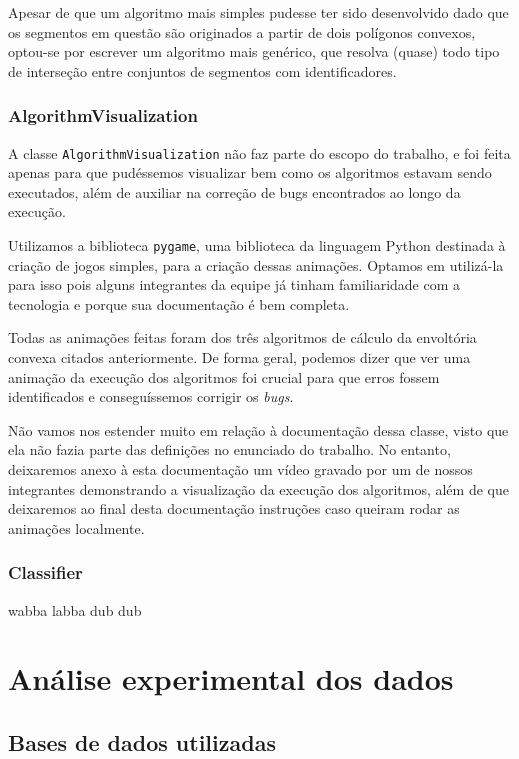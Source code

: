 \documentclass{article}
\begin{document}
Apesar de que um algoritmo mais simples pudesse ter sido desenvolvido dado que os segmentos em questão são originados a partir de dois polígonos convexos, optou-se por escrever um algoritmo mais genérico, que resolva (quase) todo tipo de interseção entre conjuntos de segmentos com identificadores.

\subsubsection{AlgorithmVisualization}

A classe \texttt{AlgorithmVisualization} não faz parte do escopo do trabalho, e foi feita apenas para que pudéssemos visualizar bem como os algoritmos estavam sendo executados, além de auxiliar na correção de bugs encontrados ao longo da execução.

Utilizamos a biblioteca \texttt{pygame}, uma biblioteca da linguagem Python destinada à criação de jogos simples, para a criação dessas animações. Optamos em utilizá-la para isso pois alguns integrantes da equipe já tinham familiaridade com a tecnologia e porque sua documentação é bem completa.

Todas as animações feitas foram dos três algoritmos de cálculo da envoltória convexa citados anteriormente. De forma geral, podemos dizer que ver uma animação da execução dos algoritmos foi crucial para que erros fossem identificados e conseguíssemos corrigir os \textit{bugs}.

Não vamos nos estender muito em relação à documentação dessa classe, visto que ela não fazia parte das definições no enunciado do trabalho. No entanto, deixaremos anexo à esta documentação um vídeo gravado por um de nossos integrantes demonstrando a visualização da execução dos algoritmos, além de que deixaremos ao final desta documentação instruções caso queiram rodar as animações localmente.

\subsubsection{Classifier}

wabba labba dub dub

\section{Análise experimental dos dados}

\subsection{Bases de dados utilizadas}
\end{document}
